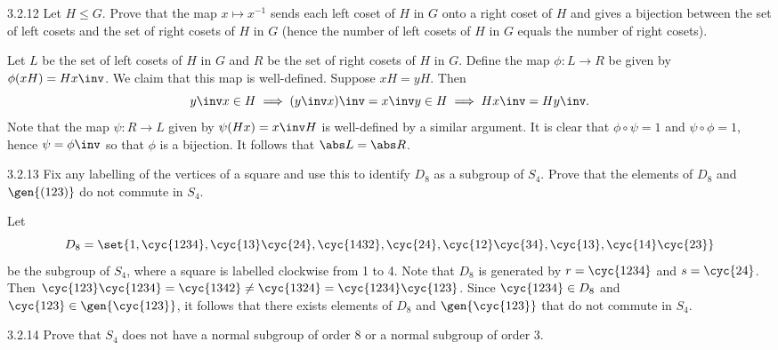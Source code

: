 \begin{exercise}{3.2.12}
    Let $H \leq G$.
	Prove that the map $x \mapsto x^{-1}$ sends each left coset of $H$ in $G$ onto a right coset of $H$ and gives a bijection between the set of left cosets and the set of right cosets of $H$ in $G$ (hence the number of left cosets of $H$ in $G$ equals the number of right cosets).
\end{exercise}

\begin{sol}
    Let $L$ be the set of left cosets of $H$ in $G$ and $R$ be the set of right cosets of $H$ in $G$.
	Define the map $\phi : L \to R$ be given by $\phi(xH) = Hx\inv$.
	We claim that this map is well-defined. Suppose $xH = yH$.
	Then
	\[
		y\inv x \in H \implies (y\inv x)\inv = x\inv y \in H \implies Hx\inv = Hy\inv.
	\]
	Note that the map $\psi : R \to L$ given by $\psi(Hx) = x\inv H$ is well-defined by a similar argument.
	It is clear that $\phi \circ \psi = 1$ and $\psi \circ \phi = 1$, hence $\psi = \phi\inv$ so that $\phi$ is a bijection.
	It follows that $\abs L = \abs R$.
\end{sol}

\begin{exercise}{3.2.13}
    Fix any labelling of the vertices of a square and use this to identify $D_8$ as a subgroup of $S_4$.
	Prove that the elements of $D_8$ and $\gen{(123)}$ do not commute in $S_4$.
\end{exercise}

\begin{sol}
    Let 
    \[
    	D_8 = \set{1, \cyc{1 2 3 4}, \cyc{1 3}\cyc{2 4}, \cyc{1 4 3 2}, \cyc{2 4}, \cyc{1 2}\cyc{3 4}, \cyc{1 3}, \cyc{1 4}\cyc{2 3}}
    \]
    be the subgroup of $S_4$, where a square is labelled clockwise from 1 to 4.
	Note that $D_8$ is generated by $r = \cyc{1 2 3 4}$ and $s = \cyc{2 4}$.
	Then $\cyc{1 2 3}\cyc{1 2 3 4} = \cyc{1 3 4 2} \neq \cyc{1 3 2 4} = \cyc{1 2 3 4}\cyc{1 2 3}$.
	Since $\cyc{1 2 3 4} \in D_8$ and $\cyc{1 2 3} \in \gen{\cyc{1 2 3}}$, it follows that there exists elements of $D_8$ and $\gen{\cyc{1 2 3}}$ that do not commute in $S_4$.
\end{sol}

\begin{exercise}{3.2.14}
    Prove that $S_4$ does not have a normal subgroup of order 8 or a normal subgroup of order 3.
\end{exercise}

